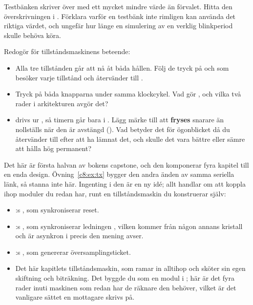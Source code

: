  Testbänken skriver över  med ett mycket mindre värde än förvalet.
Hitta den överskrivningen i . Förklara varför en testbänk inte rimligen kan
använda det riktiga värdet, och ungefär hur länge en simulering av en verklig blinkperiod skulle
behöva köra.

 Redogör för tillståndsmaskinens beteende:
\begin{itemize}
  \item Alla tre tillstånden går att nå åt båda hållen. Följ de tryck på  och
     som besöker varje tillstånd och återvänder till .
  \item Tryck på båda knapparna under samma klockcykel. Vad gör , och vilka två rader
    i arkitekturen avgör det?
  \item {} drivs ur , så timern går bara i . Lägg
    märke till att  \textbf{fryses} snarare än nollställs när den är avstängd
    (). Vad betyder det för ögonblicket då du återvänder till
     efter att ha lämnat det, och skulle det vara bättre eller sämre att hålla
     hög permanent?
\end{itemize}


\label{c8:ex:rx}
Det här är första halvan av bokens capstone, och den komponerar fyra kapitel till en enda design.
Övning~\ref{c8:ex:tx} bygger den andra änden av samma seriella länk, så stanna inte här. Ingenting i
den är en ny idé; allt handlar om att koppla ihop moduler du redan har, runt en tillståndsmaskin du
konstruerar själv:
\begin{itemize}
  \item {}:s , som synkroniserar reset.
  \item {}:s , som synkroniserar ledningen , vilken kommer från
    någon annans kristall och är asynkron i precis den mening  avser.
  \item {}:s , som genererar översamplingsticket.
  \item Det här kapitlets tillståndsmaskin, som ramar in alltihop och sköter sin egen skiftning och
    biträkning. Det byggde du som en modul i ; här är det fyra rader inuti maskinen
    som redan har de räknare den behöver, vilket är det vanligare sättet en mottagare skrivs på.
\end{itemize}

